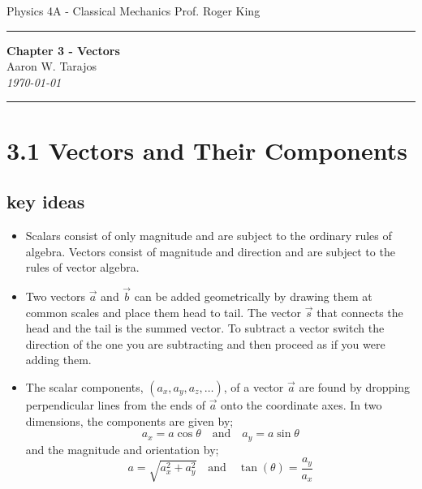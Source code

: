 \documentclass{article}
\begin{document}
\noindent
Physics 4A - Classical Mechanics \hfill Prof. Roger King

\noindent\rule{\textwidth}{0.4pt}

\begin{center}
    \textbf{\LARGE Chapter 3 - Vectors} \\
    \vspace{12pt}
    \large Aaron W. Tarajos \\
    \textit{\today}
\end{center}

\noindent\rule{\textwidth}{0.4pt}

\section*{3.1 Vectors and Their Components}
\subsection*{key ideas}
\begin{itemize}
	\item Scalars consist of only magnitude and are subject to the ordinary rules of algebra.
	Vectors consist of magnitude and direction and are subject to the rules of vector algebra.
	\item Two vectors $\vec{a}$ and $\vec{b}$ can be added geometrically by drawing them at common scales and place them head to tail.
	The vector $\vec{s}$ that connects the head and the tail is the summed vector.
	To subtract a vector switch the direction of the one you are subtracting and then proceed as if you were adding them.
	\item The scalar components, $(a_x, a_y, a_z, \dots)$, of a vector $\vec{a}$ are found by dropping perpendicular lines from the ends of
	$\vec{a}$ onto the coordinate axes. In two dimensions, the components are given by;
	\[
		a_x = a \cos{\theta} \quad \text{and} \quad a_y = a \sin{\theta}
	\]
	and the magnitude and orientation by;
	\[
		a = \sqrt{a_x^2 + a_y^2} \quad \text{and} \quad \tan(\theta) = \frac{a_y}{a_x}
	\]
\end{itemize}
\end{document}
